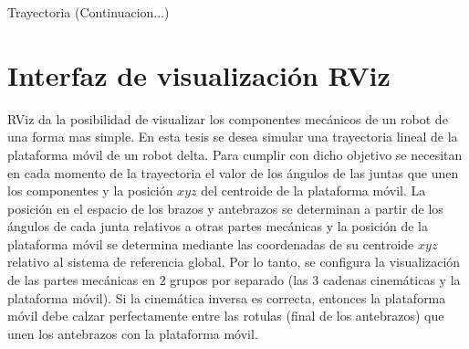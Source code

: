     \clearpage   
        
\begin{algorithm}
      \ContinuedFloat
      \caption{Trayectoria (Continuacion...)}
\end{algorithm}
    
        \newpage
    
    

    \newpage

\section{Interfaz de visualización RViz}

    RViz da la posibilidad de visualizar los componentes mecánicos de un robot de una forma mas simple. En esta tesis se desea simular una trayectoria lineal de la plataforma móvil de un robot delta. Para cumplir con dicho objetivo se necesitan en cada momento de la trayectoria el valor de los ángulos de las juntas que unen los componentes y la posición $xyz$ del centroide de la plataforma móvil. La posición en el espacio de los brazos y antebrazos se determinan a partir de los ángulos de cada junta relativos a otras partes mecánicas y la posición de la plataforma móvil se determina mediante las coordenadas de su centroide $xyz$ relativo al sistema de referencia global. Por lo tanto, se configura la visualización de las partes mecánicas en 2 grupos por separado (las 3 cadenas cinemáticas y la plataforma móvil). Si la cinemática inversa es correcta, entonces la plataforma móvil debe calzar perfectamente entre las rotulas (final de los antebrazos) que unen los antebrazos con la plataforma móvil.
     
